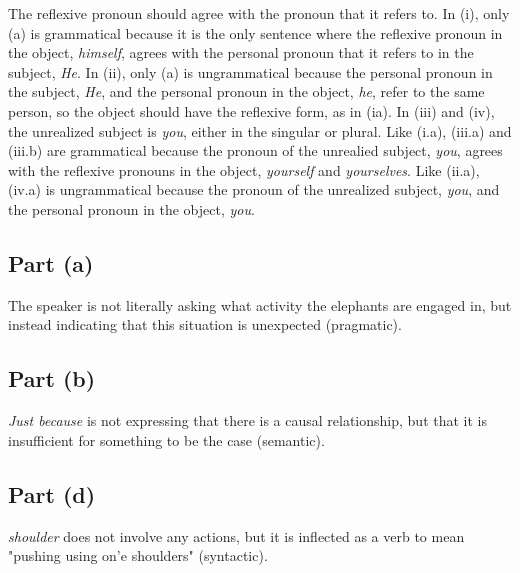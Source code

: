 \documentclass{article}
\begin{document}
The reflexive pronoun should agree with the pronoun that it refers to. In (i), only (a) is grammatical because it is the only sentence where the reflexive pronoun in the object, \textit{himself}, agrees with the personal pronoun that it refers to in the subject, \textit{He}. In (ii), only (a) is ungrammatical because the personal pronoun in the subject,  \textit{He}, and the personal pronoun in the object, \textit{he}, refer to the same person, so the object should have the reflexive form, as in (ia). In (iii) and (iv), the unrealized subject is \textit{you}, either in the singular or plural. Like (i.a), (iii.a) and (iii.b) are grammatical because the pronoun of the unrealied subject, \textit{you}, agrees with the reflexive pronouns in the object, \textit{yourself} and \textit{yourselves}. Like (ii.a), (iv.a) is ungrammatical because the pronoun of the unrealized subject, \textit{you}, and the personal pronoun in the object,  \textit{you}.
\clearpage

\subsection*{Part (a)}
The speaker is not literally asking what activity the elephants are engaged in, but instead indicating that this situation is unexpected (pragmatic).
\subsection*{Part (b)}
\textit{Just because} is not expressing that there is a causal relationship, but that it is insufficient for something to be the case (semantic).
\subsection*{Part (d)}
\textit{shoulder} does not involve any actions, but it is inflected as a verb to mean "pushing using on'e shoulders" (syntactic).
\end{document}
